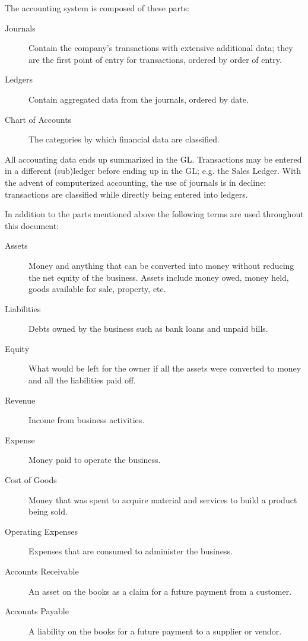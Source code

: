 The accounting system is composed of these parts:
\begin{description}
        \item [Journals] Contain the company's transactions with extensive additional data; they are the first point of entry for transactions, ordered by order of entry.
        \item [Ledgers] Contain aggregated data from the journals, ordered by date.
        \item [Chart of Accounts] The categories by which financial data are classified.
\end{description}

All accounting data ends up summarized in the \acrshort{GL}. Transactions may be entered in a different (sub)ledger before ending up in the \acrshort{GL}; e.g. the Sales Ledger. With the advent of computerized accounting, the use of journals is in decline: transactions are classified while directly being entered into ledgers.

In addition to the parts mentioned above the following terms are used throughout this document:
\begin{description}
        \item [Assets] Money and anything that can be converted into money without reducing
        the net equity of the business. Assets include money owed, money held, goods
        available for sale, property, etc.
        \item [Liabilities] Debts owned by the business such as bank loans and unpaid bills.
        \item [Equity] What would be left for the owner if all the assets were converted to
        money and all the liabilities paid off.
        \item [Revenue] Income from business activities.
        \item [Expense] Money paid to operate the business.
        \item [Cost of Goods] Money that was spent to acquire material and services to build a product being sold.
        \item [Operating Expenses] Expenses that are consumed to administer the business.
        \item [Accounts Receivable] An asset on the books as a claim for a future payment
        from a customer.
        \item [Accounts Payable] A liability on the books for a future payment to a supplier
        or vendor.
\end{description}

